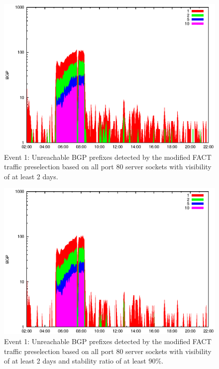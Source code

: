 \begin{figure}
	[p] \centering 
	\includegraphics[width=0.75\linewidth]{images/events/2010_03_25/bgp_log_port80_Set_stab_0_vts_2.eps}
	\caption{Event 1: Unreachable BGP prefixes detected by the modified FACT traffic preselection based on all port 80 server sockets with visibility of at least 2 days.} 
	\label{fig:AMS_IX_FACT_allSES80VTS2} 
\end{figure}

\begin{figure}
	[p] \centering 
	\includegraphics[width=0.75\linewidth]{images/events/2010_03_25/bgp_log_port80_Set_stab_9_vts_2.eps}
	\caption{Event 1: Unreachable BGP prefixes detected by the modified FACT traffic preselection based on all port 80 server sockets with visibility of at least 2 days and stability ratio of at least $90\%$.} 
	\label{fig:AMS_IX_FACT_allSES80VTS2STAB9} 
\end{figure}

